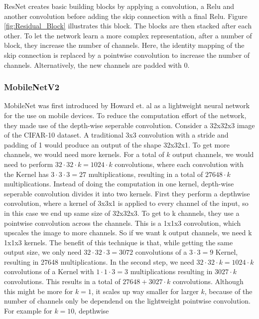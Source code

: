 ResNet creates basic building blocks by applying a convolution, a Relu and
another convolution before adding the skip connection with a final Relu. Figure
\ref{fig:Residual_Block} illustrates this block. The blocks are then stacked
after each other. To let the network learn a more complex representation, after
a number of block, they increase the number of channels. Here, the identity
mapping of the skip connection is replaced by a pointwise convolution to
increase the number of channels. Alternatively, the new channels are padded with
0.



\subsubsection{MobileNetV2}\label{sub:MobileNetV2}
MobileNet was first introduced by Howard et. al \cite{howard2017mobilenets} as a
lightweight neural network for the use on mobile devices. To reduce the
computation effort of the network, they made use of the depth-wise seperable
convolution. Consider a 32x32x3 image of the CIFAR-10 dataset. A traditional 3x3
convolution with a stride and padding of 1 would produce an output of the shape
32x32x1. To get more channels, we would need more kernels. For a total of $k$
output channels, we would need to perform $32\cdot 32 \cdot k=1024\cdot k$
convolutions, where each convolution with the Kernel has $3\cdot 3 \cdot 3=27$
multiplications, resulting in a total of $27648\cdot k$ multiplications.
Instead of doing the computation in one kernel, depth-wise seperable convolution
divides it into two kernels. First they perform a depthwise convolution, where a
kernel of 3x3x1 is applied to every channel of the input, so in this case we end
up same size of 32x32x3. To get to k channels, they use a pointwise convolution
across the channels. This is a 1x1x3 convolution, which upscales the image to
more channels. So if we want k output channels, we need k 1x1x3 kernels. The
benefit of this technique is that, while getting the same output size, we only
need $32\cdot 32 \cdot 3=3072$ convolutions of a $3\cdot 3=9$ Kernel, resulting
in 27648 multiplications. In the second step, we need $32\cdot 32\cdot
k=1024\cdot k$ convolutions of a Kernel with $1\cdot 1\cdot 3=3$ multiplications
resulting in $3027\cdot k$ convolutions. This results in a total of $27648 +
3027\cdot k$ convolutions. Although this might be more for $k=1$, it scales up
way smaller for larger $k$, because of the number of channels only be dependend
on the lightweight pointwise convolution. For example for $k=10$, depthwise
